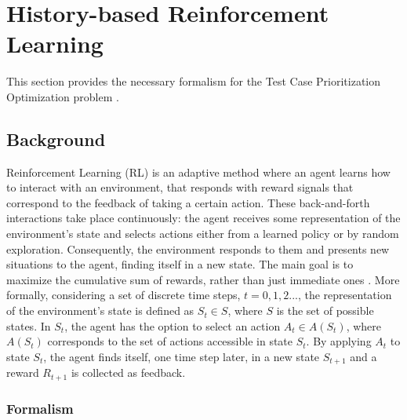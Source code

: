 
\chapter{History-based Reinforcement Learning}
\label{chapter:paper1}

This section provides the necessary formalism for the Test Case Prioritization Optimization problem .

\section{Background}

Reinforcement Learning (RL) is an adaptive method where an agent learns how to interact with an environment, that responds with reward signals that correspond to the feedback of taking a certain action. These back-and-forth interactions take place continuously: the agent receives some representation of the environment's state and selects actions either from a learned policy or by random exploration.
Consequently, the environment responds to them and presents new situations to the agent, finding itself in a new state. The main goal is to maximize the cumulative sum of rewards, rather than just immediate ones \cite{rlintro}. More formally, considering a set of discrete time steps, $t = 0, 1, 2 ...$, the representation of the environment's state is defined as $S_t \in S$, where $S$ is the set of possible states. In $S_t$, the agent has the option to select an action $A_t \in A(S_t)$, where $A(S_t)$ corresponds to the set of actions accessible in state $S_t$. By applying $A_t$ to state $S_t$, the agent finds itself, one time step later, in a new state $S_{t+1}$ and a reward $R_{t+1}$ is collected as feedback. 
\\


\subsection{Formalism}
